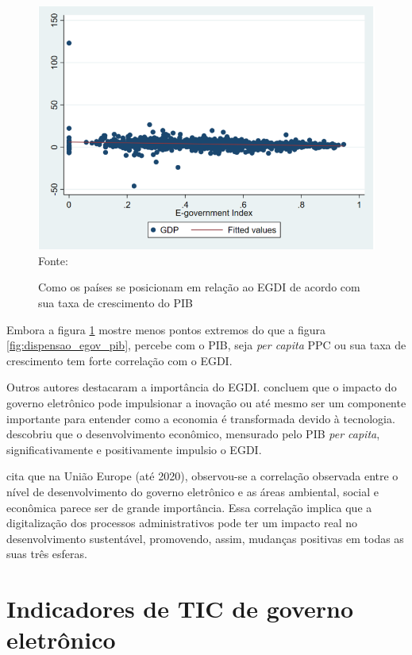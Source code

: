 \begin{figure}[H]
	\centering
	\caption{Como os países se posicionam em relação ao EGDI de acordo com sua taxa de crescimento do PIB}
	\includegraphics[width=1\linewidth]{figuras/egdi/usmanova_egdi_gdp}
	\label{fig:usmanova_egdi_gdp}
	\footnotesize{Fonte: \cite{alisherovna2021whether}}
\end{figure}

Embora a figura \ref{fig:usmanova_egdi_gdp} mostre menos pontos extremos do que a figura \ref{fig:dispensao_egov_pib}, percebe com o PIB, seja \textit{per capita} PPC ou sua taxa de crescimento tem forte correlação com o EGDI. 

Outros autores destacaram a importância do EGDI. \cite{kotenok2020government} concluem que o impacto do governo eletrônico pode impulsionar a inovação ou até mesmo ser um componente importante para entender como a economia é transformada devido à tecnologia. \cite{kumar2020cultural} descobriu que o desenvolvimento econômico, mensurado pelo PIB \textit{per capita}, significativamente e positivamente impulsio o EGDI. 

\cite{ziolo2022government} cita que na União Europe (até 2020), observou-se a correlação observada entre o nível de desenvolvimento do governo eletrônico e as áreas ambiental, social e econômica parece ser de grande importância. Essa correlação implica que a digitalização dos processos administrativos pode ter um impacto real no desenvolvimento sustentável, promovendo, assim, mudanças positivas em todas as suas três esferas.


\section{Indicadores de TIC de governo eletrônico}
\label{indicadores_tic_egov}


